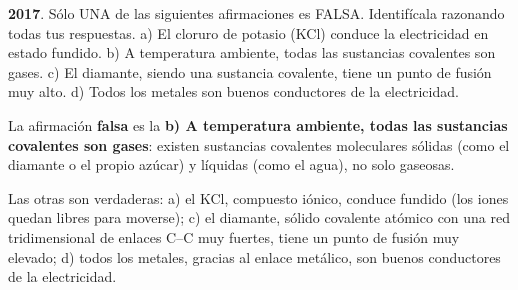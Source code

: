 \begin{exerciseEVAU}
    \textbf{2017}. Sólo UNA de las siguientes afirmaciones es FALSA. Identifícala razonando todas tus respuestas. a) El cloruro de potasio (KCl) conduce la electricidad en estado fundido. b) A temperatura ambiente, todas las sustancias covalentes son gases. c) El diamante, siendo una sustancia covalente, tiene un punto de fusión muy alto. d) Todos los metales son buenos conductores de la electricidad.
    \begin{solu}

        La afirmación \textbf{falsa} es la \textbf{b) A temperatura ambiente, todas las sustancias covalentes son gases}: existen sustancias covalentes moleculares sólidas (como el diamante o el propio azúcar) y líquidas (como el agua), no solo gaseosas.

        Las otras son verdaderas: a) el KCl, compuesto iónico, conduce fundido (los iones quedan libres para moverse); c) el diamante, sólido covalente atómico con una red tridimensional de enlaces C--C muy fuertes, tiene un punto de fusión muy elevado; d) todos los metales, gracias al enlace metálico, son buenos conductores de la electricidad.
    \end{solu}
\end{exerciseEVAU}



